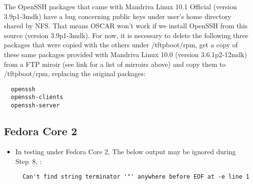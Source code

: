 \begin{itemize}
The OpenSSH packages that came with Mandriva Linux 10.1 Official (version 
3.9p1-3mdk) have a bug concerning public keys under user's home directory 
shared by NFS. That means OSCAR won't work if we install OpenSSH from this 
source (version 3.9p1-3mdk). For now, it is necessary to delete the following 
three packages that were copied with the others under /tftpboot/rpm, get a copy 
of these same packages provided with Mandriva Linux 10.0 (version 3.6.1p2-12mdk) 
from a FTP miroir (see link for a list of mirroirs above) and copy them to 
/tftpboot/rpm, replacing the original packages:
\begin{verbatim}
  openssh
  openssh-clients
  openssh-server
\end{verbatim}

\end{itemize}


\subsection{Fedora Core 2}
\label{subsec:fc2notes}

\begin{itemize}
\item In testing under Fedora Core 2, The below output may be ignored during 
Step~8, :
\begin{verbatim}
  Can't find string terminator '"' anywhere before EOF at -e line 1
\end{verbatim}
\end{itemize}

